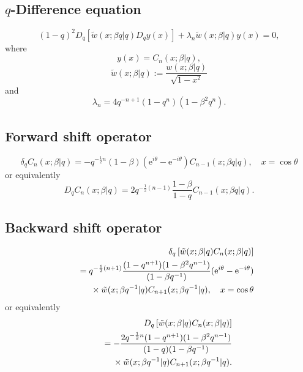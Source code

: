 \documentclass[envcountchap,graybox]{svmono}
\newcommand{\mathindent}{\hspace{7.5mm}}
\newcommand{\e}{\textrm{e}}
\begin{document}
\subsection*{$q$-Difference equation}
\begin{equation}
\label{dvContqUltra}
(1-q)^2D_q\left[{\tilde w}(x;\beta q|q)D_qy(x)\right]+
\lambda_n{\tilde w}(x;\beta|q)y(x)=0,
\end{equation}
where
$$y(x)=C_n(x;\beta|q),$$
$${\tilde w}(x;\beta|q):=\frac{w(x;\beta|q)}{\sqrt{1-x^2}}$$
and
$$\lambda_n=4q^{-n+1}(1-q^n)(1-\beta^2q^n).$$

\subsection*{Forward shift operator}
\begin{equation}
\label{shift1ContqUltraI}
\delta_qC_n(x;\beta|q)=-q^{-\frac{1}{2}n}(1-\beta)(\e^{i\theta}-\e^{-i\theta})
C_{n-1}(x;\beta q|q),\quad x=\cos\theta
\end{equation}
or equivalently
\begin{equation}
\label{shift1ContqUltraII}
D_qC_n(x;\beta|q)=2q^{-\frac{1}{2}(n-1)}\frac{1-\beta}{1-q}C_{n-1}(x;\beta q|q).
\end{equation}

\newpage

\subsection*{Backward shift operator}
\begin{eqnarray}
\label{shift2ContqUltraI}
& &\delta_q\left[{\tilde w}(x;\beta|q)C_n(x;\beta|q)\right]\nonumber\\
& &{}=q^{-\frac{1}{2}(n+1)}\frac{(1-q^{n+1})(1-\beta^2q^{n-1})}{(1-\beta q^{-1})}
(\e^{i\theta}-\e^{-i\theta})\nonumber\\
& &{}\mathindent{}\times{\tilde w}(x;\beta q^{-1}|q)C_{n+1}(x;\beta q^{-1}|q),\quad x=\cos\theta
\end{eqnarray}
or equivalently
\begin{eqnarray}
\label{shift2ContqUltraII}
& &D_q\left[{\tilde w}(x;\beta|q)C_n(x;\beta|q)\right]\nonumber\\
& &{}=-\frac{2q^{-\frac{1}{2}n}(1-q^{n+1})(1-\beta^2q^{n-1})}{(1-q)(1-\beta q^{-1})}\nonumber\\
& &{}\mathindent{}\times{\tilde w}(x;\beta q^{-1}|q)C_{n+1}(x;\beta q^{-1}|q).
\end{eqnarray}
\end{document}
